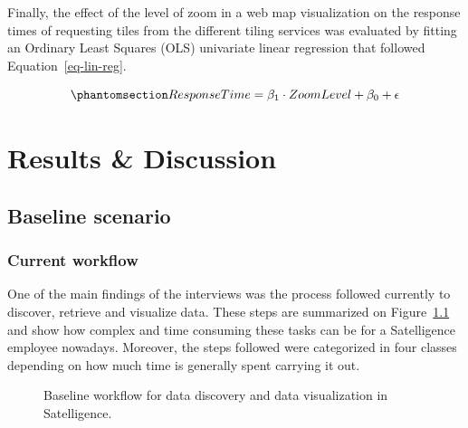\documentclass[
  oneside,
  open=any]{scrbook}
\begin{document}
Finally, the effect of the level of zoom in a web map visualization on
the response times of requesting tiles from the different tiling
services was evaluated by fitting an Ordinary Least Squares (OLS)
univariate linear regression that followed Equation~\ref{eq-lin-reg}.

\begin{equation}\phantomsection\label{eq-lin-reg}{ ResponseTime = \beta_1 \cdot ZoomLevel + \beta_0 + \epsilon }\end{equation}

\chapter{Results \& Discussion}\label{results-discussion}

\section{Baseline scenario}\label{baseline-scenario}

\subsection{Current workflow}\label{current-workflow}

One of the main findings of the interviews was the process followed
currently to discover, retrieve and visualize data. These steps are
summarized on Figure~\ref{fig-baseline} and show how complex and time
consuming these tasks can be for a Satelligence employee nowadays.
Moreover, the steps followed were categorized in four classes depending
on how much time is generally spent carrying it out.

\begin{figure}[H]


\caption{\label{fig-baseline}Baseline workflow for data discovery and
data visualization in Satelligence.}

\end{figure}%
\end{document}
